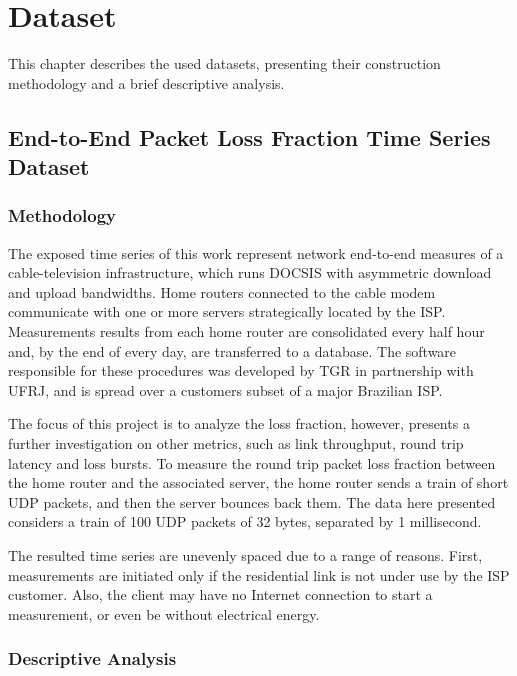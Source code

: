 \chapter{Dataset}

This chapter describes the used datasets, presenting their construction methodology and a brief descriptive analysis.

\section{End-to-End Packet Loss Fraction Time Series Dataset}

\subsection{Methodology}

The exposed time series of this work represent network end-to-end measures of a cable-television infrastructure, which runs DOCSIS with asymmetric download and upload bandwidths. Home routers connected to the cable modem communicate with one or more servers strategically located by the ISP. Measurements results from each home router are consolidated every half hour and, by the end of every day, are transferred to a database. The software responsible for these procedures was developed by TGR in partnership with UFRJ, and is spread over a customers subset of a major Brazilian ISP.

The focus of this project is to analyze the loss fraction, however, \cite{a_preliminary_performance_measurement_study_of_residential_broadband_services_in_brazil} presents a further investigation on other metrics, such as link throughput, round trip latency and loss bursts. To measure the round trip packet loss fraction between the home router and the associated server, the home router sends a train of short UDP packets, and then the server bounces back them. The data here presented considers a train of 100 UDP packets of 32 bytes, separated by 1 millisecond.

The resulted time series are unevenly spaced due to a range of reasons. First, measurements are initiated only if the residential link is not under use by the ISP customer. Also, the client may have no Internet connection to start a measurement, or even be without electrical energy.

\subsection{Descriptive Analysis}

